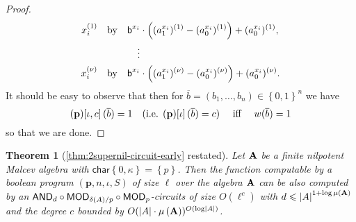 \documentclass[11pt,a4paper]{amsart}
\newtheorem{thm}[lm]{Theorem}
\newcommand{\m}[1]{{\uppercase {\bf{#1}}}}
\newcommand{\set}[1]{{\left\{ {#1} \right\} }}
\newcommand{\card}[1]{\left| #1 \right|}
\renewcommand{\leq}{\leqslant}
\newcommand{\po}[1]{{\mathbf {#1}}}
\renewcommand{\o}[1]{\overline {#1}}
\newcommand{\charr}{\mathsf{char}}
\newcommand{\charrset}[1]{\charr\set{#1}}
\newcommand{\progg}[4]{\left(#1,#2,#3,#4\right)}
\newcommand{\prog}[2]{\left(#1\right)\!\left[#2\right]}
\newcommand{\progb}[3]{\left(#1\right)\!\left[#2,#3\right]}
\renewcommand{\b}{\textsf{b}}
\newcommand{\true}{1}
\newcommand{\false}{0}
\newcommand{\bool}{\set{\false,\true}}
\newcommand{\ccc}{c}    \newcommand{\s}{s}
\newcommand{\ccand}{\mathsf{AND}}
\newcommand{\ccmod}{\mathsf{MOD}}
\newcommand{\pdiv}[1]{\ppdiv\left(#1\right)}    \newcommand{\ar}[1]{\mu\left({#1}\right)}       \newcommand{\maxar}[1]{\mu\left({\m #1}\right)}
\begin{document}
\begin{proof}
\begin{align*}
x_i^{(1)} &\mbox{\quad by}
&\b^{x_i} &\cdot \left((a_1^{x_i})^{(1)}-(a_0^{x_i})^{(1)}\right)+(a_0^{x_i})^{(1)},
\\
&&\vdots
\\
x_i^{(\nu)} &\mbox{\quad by}
&\b^{x_i} &\cdot \left((a_1^{x_i})^{(\nu)}-(a_0^{x_i})^{(\nu)}\right)+(a_0^{x_i})^{(\nu)}.
\end{align*}
It should be easy to observe that then for $\o b=(b_1,\ldots,b_n)\in \bool^n$ we have
\[
\progb{\po p}{\iota}{\ccc}(\o b)=\true
\mbox{\quad  (i.e. $\prog{\po p}{\iota}(\o b)=\ccc$) \quad iff \quad}
w(\o b)=\true
\]
so that we are done.
\end{proof}

\begin{thm}[\cref{thm:2supernil-circuit-early} restated]
\label{thm:2supernil-circuit}
Let $\m A$ be a finite nilpotent Malcev algebra with $\charrset{0,\kappa}=\set{p}$.
Then the function computable by a boolean program
$\progg{\po p}{n}{\iota}{S}$ of size $\ell$ over the algebra $\m A$
can be also computed by an
$\ccand_d\circ\ccmod_{\pdiv A/p}\circ\ccmod_p$-circuits of size $O(\ell^c)$
with $d\leq\card{A}^{1+\log\maxar A}$
and the degree $c$  bounded by $O(\card{A}\cdot\maxar{A})^{O(\log\card{A})}$.
\end{thm}
\end{document}
